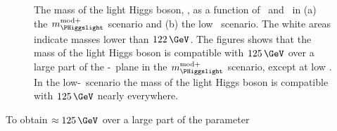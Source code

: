 \begin{figure}[h!]
\begin{center}
\end{center}
\caption[The mass of the light Higgs boson, \mh, as a function of \mA~and
\tanb~in the $m_{\PHiggslight}^{\text{mod+}}$ scenario and the low \tanb~scenario.]{The mass of the light Higgs boson, \mh, as a function 
of \mA~and \tanb~in (a) the $m_{\PHiggslight}^{\text{mod+}}$ scenario and (b) the low \tanb~scenario. The white areas
indicate masses lower than $122\,\GeV$. The figures shows that
the mass of the light Higgs boson is compatible with $125\,\GeV$ over a large
part of the \mA-\tanb~plane in the $m_{\PHiggslight}^{\text{mod+}}$ scenario, except at low \tanb. In the low-\tanb~scenario
the mass of the light Higgs boson is compatible with $125\,\GeV$ nearly everywhere.}
\label{fig:mhmodp_mh}
\end{figure}
To obtain \mh$\approx125\,\GeV$ over a large part of the parameter
